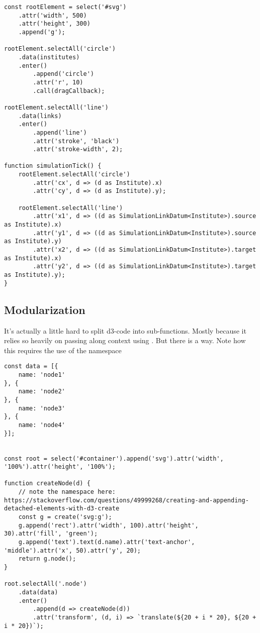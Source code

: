 \begin{lstlisting}
const rootElement = select('#svg')
    .attr('width', 500)
    .attr('height', 300)
    .append('g');

rootElement.selectAll('circle')
    .data(institutes)
    .enter()
        .append('circle')
        .attr('r', 10)
        .call(dragCallback);

rootElement.selectAll('line')
    .data(links)
    .enter()
        .append('line')
        .attr('stroke', 'black')
        .attr('stroke-width', 2);

function simulationTick() {
    rootElement.selectAll('circle')
        .attr('cx', d => (d as Institute).x)
        .attr('cy', d => (d as Institute).y);

    rootElement.selectAll('line')
        .attr('x1', d => ((d as SimulationLinkDatum<Institute>).source as Institute).x)
        .attr('y1', d => ((d as SimulationLinkDatum<Institute>).source as Institute).y)
        .attr('x2', d => ((d as SimulationLinkDatum<Institute>).target as Institute).x)
        .attr('y2', d => ((d as SimulationLinkDatum<Institute>).target as Institute).y);
}
\end{lstlisting}


\subsection{Modularization}
It's actually a little hard to split d3-code into sub-functions. Mostly because it relies so heavily on passing along context using . But there is a way. Note how this requires the use of the  namespace
\begin{lstlisting}
const data = [{
    name: 'node1'
}, {
    name: 'node2'
}, {
    name: 'node3'
}, {
    name: 'node4'
}];


const root = select('#container').append('svg').attr('width', '100%').attr('height', '100%');

function createNode(d) {
    // note the namespace here: https://stackoverflow.com/questions/49999268/creating-and-appending-detached-elements-with-d3-create
    const g = create('svg:g');
    g.append('rect').attr('width', 100).attr('height', 30).attr('fill', 'green');
    g.append('text').text(d.name).attr('text-anchor', 'middle').attr('x', 50).attr('y', 20);
    return g.node();
}

root.selectAll('.node')
    .data(data)
    .enter()
        .append(d => createNode(d))
        .attr('transform', (d, i) => `translate(${20 + i * 20}, ${20 + i * 20})`);
\end{lstlisting}


